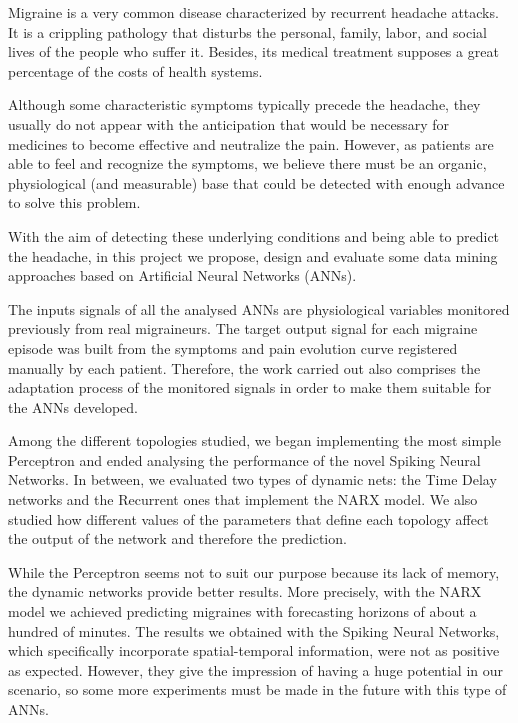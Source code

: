 
 
Migraine is a very common disease characterized by recurrent headache attacks. It is a crippling pathology that disturbs the personal, family, labor, and social lives of the people who suffer it. Besides, its medical treatment supposes a great percentage of the costs of health systems.

Although some characteristic symptoms typically precede the headache, they usually do not appear with the anticipation that would be necessary for medi\-cines to become effective and neutralize the pain. However, as patients are able to feel and recognize the symptoms, we believe there must be an organic, physiological (and measurable) base that could be detected with enough advance to solve this problem.

With the aim of detecting these underlying conditions and being able to predict the headache, in this project we propose, design and evaluate some data mining approaches based on Artificial Neural Networks (ANNs). 

The inputs signals of all the analysed ANNs are physiological variables monitored previously from real migraineurs. 
The target output signal for each migraine episode was built from the symptoms and pain evolution curve registered manually by each patient.
Therefore, the work carried out also comprises the adaptation process of the monitored signals in order to make them suitable for the ANNs developed.

Among the different topologies studied, we began implementing the most simple Perceptron and ended analysing the performance of the novel Spiking Neural Networks. In between, we evaluated two types of dynamic nets: the Time Delay networks and the Recurrent ones that implement the NARX model. We also studied how different values of the parameters that define each topology affect the output of the network and therefore the prediction.

While the Perceptron seems not to suit our purpose because its lack of memory, the dynamic networks provide better results. More precisely, with the NARX model we achieved predicting migraines with forecasting horizons of about a hundred of minutes. 
The results we obtained with the Spiking Neural Networks, which specifically incorporate spatial-temporal information, were not as positive as expected. However, they give the impression of having a huge potential in our scenario, so some more experiments must be made in the future with this type of ANNs.


